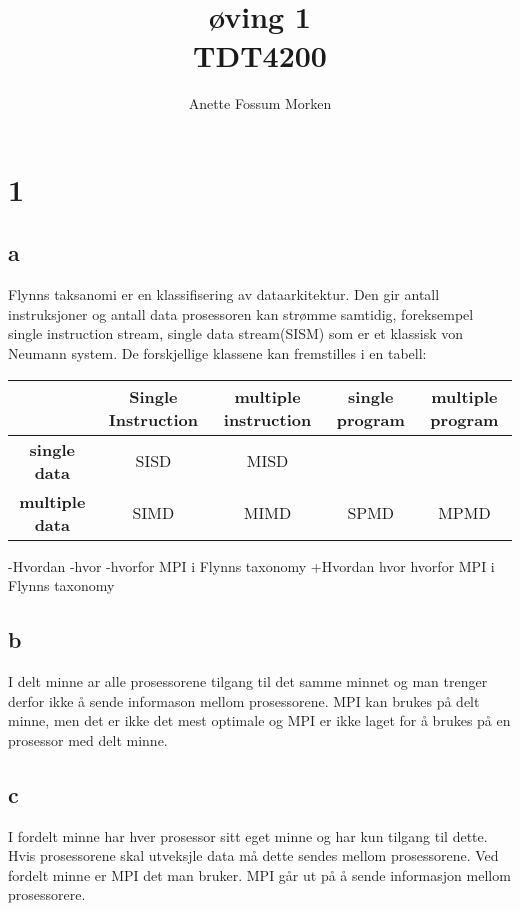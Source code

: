\documentclass[12pt, a4paper]{article} %
\title{øving 1 \\ TDT4200}
\author[1]{Anette Fossum Morken}
\date{}
\begin{document}
 \maketitle
 
 \section*{1}
 \subsection*{a}
 Flynns taksanomi er en klassifisering av dataarkitektur. Den gir antall instruksjoner og antall data prosessoren kan strømme samtidig, foreksempel single instruction stream, single data stream(SISM) som er et klassisk von Neumann system. De forskjellige klassene kan fremstilles i en tabell:
 
   \begin{tabular}{|@{}c@{}| @{}c@{} |@{}c@{}|@{} c@{} |@{}c@{}| }
     \hline
      & \textbf{Single Instruction} & \textbf{multiple instruction} & \textbf{single program} & \textbf{multiple program} \\ \hline
     \textbf{single data} & SISD & MISD & &  \\ \hline
     \textbf{multiple data} & SIMD & MIMD & SPMD & MPMD \\
     \hline
   \end{tabular}
 
-Hvordan 
-hvor 
-hvorfor  MPI i Flynns taxonomy
+Hvordan  hvor  hvorfor  MPI i Flynns taxonomy
 
 \subsection*{b}
 I delt minne ar alle prosessorene tilgang til det samme minnet og man trenger derfor ikke å sende informason mellom prosessorene. MPI kan brukes på delt minne, men det er ikke det mest optimale og MPI er ikke laget for å brukes på en prosessor med delt minne.
 
 \subsection*{c}
 I fordelt minne har hver prosessor sitt eget minne og har kun tilgang til dette. Hvis prosessorene skal utveksjle data må dette sendes mellom prosessorene. Ved fordelt minne er MPI det man bruker. MPI går ut på å sende informasjon mellom prosessorere.
 
\end{document}
